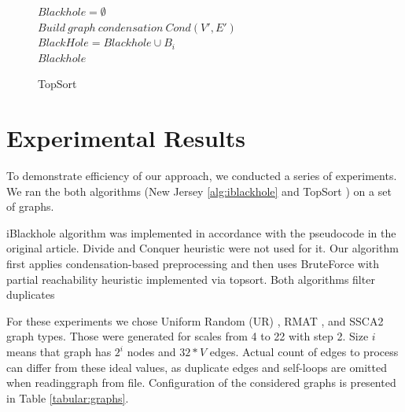\documentclass{svproc}
\begin{document}
\begin{figure}[H]
	\begin{center}
		\begin{algorithm}[H]
			\SetAlgoLined
                        
                        $Blackhole = \emptyset$\\
                        $Build\ graph\ condensation\ Cond(V',E')$\\
                         {
                             {
                                 {
                                     {
                                        $BlackHole = Blackhole \cup B_i$ \\
                                    }
                                }
                            }
                        }
                        \Return $Blackhole$
			\label{alg:topsort}
			\caption{TopSort}
		\end{algorithm}
	\end{center}
\end{figure}

%
\section{Experimental Results}
To demonstrate efficiency of our approach, we conducted a series of experiments. We ran the both algorithms (New Jersey \ref{alg:iblackhole} and TopSort ) on a 
set of graphs. 

iBlackhole algorithm was implemented in accordance with the pseudocode in the original article. Divide and Conquer heuristic were not used for it.
Our algorithm first applies condensation-based preprocessing and then uses BruteForce with partial reachability heuristic implemented via topsort.
Both algorithms filter duplicates 

For these experiments we chose Uniform Random (UR) \cite{random-uniform}, RMAT \cite{chakrabarti2004r},  and SSCA2 \cite{bader2005design} graph types. Those were generated for scales from 4 to 22
with step 2. Size $i$ means that graph has $2^i$ nodes and $32*V$ edges. Actual count of edges to process can differ from these ideal values, as duplicate edges and self-loops are omitted when readinggraph from file. Configuration of the considered graphs is presented in Table \ref{tabular:graphs}.
\end{document}
